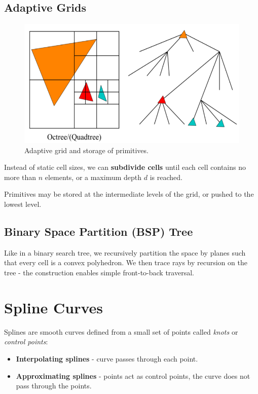\documentclass[11pt]{article}
\begin{document}
\subsection{Adaptive Grids}
\begin{figure}[htb!]
  \centering
  \caption{Adaptive grid and storage of primitives.}
  \includegraphics[scale=0.5]{adaptivegrid}
\end{figure}
Instead of static cell sizes, we can \textbf{subdivide cells} until each cell contains no more than $n$ elements, or a maximum depth $d$ is reached.

Primitives may be stored at the intermediate levels of the grid, or pushed to the lowest level.

\subsection{Binary Space Partition (BSP) Tree}
Like in a binary search tree, we recursively partition the space by planes such that every cell is a convex polyhedron.
We then trace rays by recursion on the tree - the construction enables simple front-to-back traversal.

\section{Spline Curves}
Splines are smooth curves defined from a small set of points called \textit{knots} or \textit{control points}:
\begin{itemize}
  \item \textbf{Interpolating splines} - curve passes through each point.
  \item \textbf{Approximating splines} - points act as control points, the curve does not pass through the points.
\end{itemize}
\end{document}

